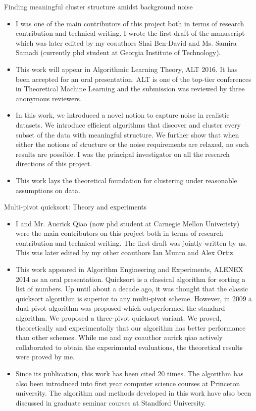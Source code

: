 \documentclass[12pt]{article}
\begin{document}
\vspace{0.15in}\noindent Finding meaningful cluster structure amidst background noise
\begin{itemize}[nolistsep]
\item I was one of the main contributors of this project both in terms of research contribution and technical writing. I wrote the first draft of the manuscript which was later edited by my coauthors Shai Ben-David and Ms. Samira Samadi (currently phd student at Georgia Institute of Technology). 
\item This work will appear in Algorithmic Learning Theory, ALT 2016. It has been accepted for an oral presentation. ALT is one of the top-tier conferences in Theoretical Machine Learning and the submission was reviewed by three anonymous reviewers.
\item In this work, we introduced a novel notion to capture noise in realistic datasets. We introduce efficient algorithms that discover and cluster every subset of the data with meaningful structure. We further show that when either the notions of structure or the noise requirements are relaxed, no such results are possible. I was the principal investigator on all the research directions of this project. 
\item This work lays the theoretical foundation for clustering under reasonable assumptions on data. 
\end{itemize}

\vspace{0.15in}\noindent Multi-pivot quicksort: Theory and experiments
\begin{itemize}[nolistsep]
\item I and Mr. Aucrick Qiao (now phd student at Carnegie Mellon Univeristy) were the main contributors on this project both in terms of research contribution and technical writing. The first draft was jointly written by us. This was later edited by my other coauthors Ian Munro and Alex Ortiz. 
\item This work appeared in Algorithm Engineering and Experiments, ALENEX 2014 as an oral presentation. Quicksort is a classical algorithm for sorting a list of numbers. Up until about a decade ago, it was thought that the classic quicksort algorithm is superior to any multi-pivot scheme. However, in 2009 a dual-pivot algorithm was proposed which outperformed the standard algorithm. We proposed a three-pivot quicksort variant. We proved, theoretically and experimentally that our algorithm has better performance than other schemes. While me and my coauthor aurick qiao actively collaborated to obtain the experimental evaluations, the theoretical results were proved by me.
\item Since its publication, this work has been cited $20$ times. The algorithm has also been introduced into first year computer science courses at Princeton university. The algorithm and methods developed in this work have also been discussed in graduate seminar courses at Standford University. 
\end{itemize}
\end{document}
